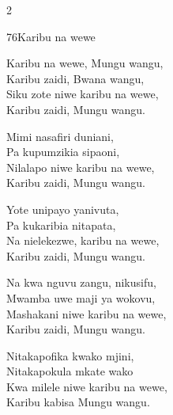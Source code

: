 \begin{multicols}{2}
\begin{hymn}{76}{Karibu na wewe}{}
\begin{stanza}
Karibu na wewe, Mungu wangu,\\
Karibu zaidi, Bwana wangu,\\
Siku zote niwe karibu na wewe,\\
Karibu zaidi, Mungu wangu.
\end{stanza}
\begin{stanza}
Mimi nasafiri duniani,\\
Pa kupumzikia sipaoni,\\
Nilalapo niwe karibu na wewe,\\
Karibu zaidi, Mungu wangu.
\end{stanza}
\begin{stanza}
Yote unipayo yanivuta,\\
Pa kukaribia nitapata,\\
Na nielekezwe, karibu na wewe,\\
Karibu zaidi, Mungu wangu.
\end{stanza}
\begin{stanza}
Na kwa nguvu zangu, nikusifu,\\
Mwamba uwe maji ya wokovu,\\
Mashakani niwe karibu na wewe,\\
Karibu zaidi, Mungu wangu.
\end{stanza}
\begin{stanza}
Nitakapofika kwako mjini,\\
Nitakapokula mkate wako\\
Kwa milele niwe karibu na wewe,\\
Karibu kabisa Mungu wangu.
\end{stanza}
\end{hymn}


\end{multicols}
